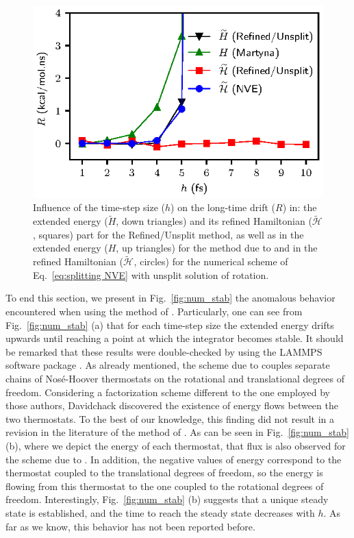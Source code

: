 \documentclass[
journal=jctcce,
layout=twocolumn
]{achemso}
\newcommand{\Ham}[1]{{\mathcal H}_\text{#1}}    %
\newcommand{\timestep}{h}
\newcommand{\refined}[1]{\widetilde{#1}}
\begin{document}
\begin{figure}
	\includegraphics{Figures/energy_drift.eps}
    \caption{Influence of the time-step size ($\timestep$) on the long-time drift ($R$) in: the extended energy ($\refined{H}$, down triangles) and its refined Hamiltonian ($\refined{\Ham{}}$, squares) part for the Refined/Unsplit method, as well as in the extended energy ($H$, up triangles) for the method due to \citeauthor{Martyna_1996} \cite{Martyna_1996} and in the refined Hamiltonian ($\refined{\Ham{}}$, circles) for the numerical scheme of Eq.~\eqref{eq:splitting NVE} with unsplit solution of rotation.}
	\label{fig:energy_drift}
\end{figure}

To end this section, we present in Fig.~\ref{fig:num_stab} the anomalous behavior encountered when using the method of \citeauthor{Kamberaj_2005} \cite{Kamberaj_2005}.
Particularly, one can see from Fig.~\ref{fig:num_stab} (a) that for each time-step size the extended energy drifts upwards until reaching a point at which the integrator becomes stable.
It should be remarked that these results were double-checked by using the LAMMPS software package \cite{Plimpton_1995}. 
As already mentioned, the scheme due to \citeauthor{Kamberaj_2005} \cite{Kamberaj_2005} couples separate chains of Nos\'{e}-Hoover thermostats on the rotational and translational degrees of freedom.
Considering a factorization scheme different to the one employed by those authors, Davidchack \cite{Davidchack_2010} discovered the existence of energy flows between the two thermostats.
To the best of our knowledge, this finding did not result in a revision in the literature of the method of \citeauthor{Kamberaj_2005} \cite{Kamberaj_2005}.
As can be seen in Fig.~\ref{fig:num_stab} (b), where we depict the energy of each thermostat, that flux is also observed for the scheme due to \citeauthor{Kamberaj_2005} \cite{Kamberaj_2005}.
In addition, the negative values of energy correspond to the thermostat coupled to the translational degrees of freedom, so the energy is flowing from this thermostat to the one coupled to the rotational degrees of freedom.
Interestingly, Fig.~\ref{fig:num_stab} (b) suggests that a unique steady state is established, and the time to reach the steady state decreases with $\timestep$. As far as we know, this behavior has not been reported before.
\end{document}
